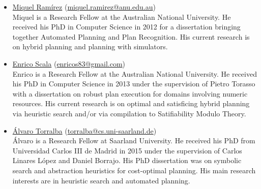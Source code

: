 \documentclass[10pt]{article}
\begin{document}
\begin{itemize}

%
\item \href{http://people.cecs.anu.edu.au/user/5404}{Miquel Ram\'{i}rez}
  (\href{mailto:miquel.ramirez@anu.edu.au}{miquel.ramirez@anu.edu.au})\\
Miquel is a Research Fellow at the Australian National University. He
received his PhD in Computer Science in 2012 for a dissertation
bringing together Automated Planning and Plan Recognition. His current
research is on hybrid planning and planning with simulators.


\item \href{http://www.hstairs.com/}{Enrico Scala}
(\href{enricos83@gmail.com}{enricos83@gmail.com})\\
Enrico is a Research Fellow at the Australian National University. He
received his PhD in Computer Science in 2013 under the supervision of Pietro Torasso with a dissertation on robust plan execution for domains involving numeric resources. His current research is on optimal and satisficing hybrid planning via heuristic search and/or via compilation to Satifiability Modulo Theory.


\item \href{https://fai.cs.uni-saarland.de/torralba/}{\'{A}lvaro
  Torralba}
  (\href{mailto:torralba@cs.uni-saarland.de}{torralba@cs.uni-saarland.de})\\ \'{A}lvaro
  is a Research Fellow at Saarland University. He received his PhD
  from Universidad Carlos III de Madrid in 2015 under the supervision
  of Carlos Linares L\'{o}pez and Daniel Borrajo. His PhD dissertation
  was on symbolic search and abstraction heuristics for cost-optimal
  planning. His main research interests are in heuristic search and
  automated planning.


\end{itemize}
\end{document}
